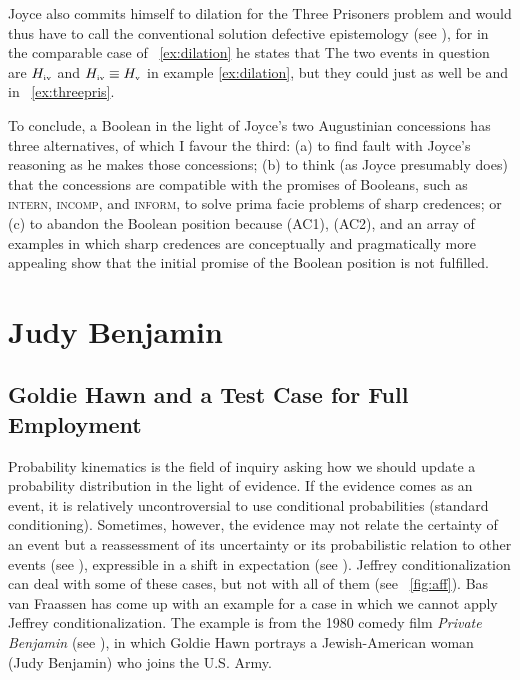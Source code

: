 \documentclass[phd,12pt,oneside]{ubcthesis}
\begin{document}
Joyce also commits himself to dilation for the Three Prisoners problem
and would thus have to call the conventional solution defective
epistemology (see ), for in the comparable case
of {\xample}~\ref{ex:dilation} he states that   The two events
in question are $H_{\mbox{\tiny{iv}}}$ and
$H_{\mbox{\tiny{iv}}}\equiv{}H_{\mbox{\tiny{v}}}$ in example
\ref{ex:dilation}, but they could just as well be  and  in
{\xample}~\ref{ex:threepris}.

To conclude, a Boolean in the light of Joyce's two Augustinian
concessions has three alternatives, of which I favour the third: (a)
to find fault with Joyce's reasoning as he makes those concessions;
(b) to think (as Joyce presumably does) that the concessions are
compatible with the promises of Booleans, such as \textsc{intern},
\textsc{incomp}, and \textsc{inform}, to solve prima facie problems of
sharp credences; or (c) to abandon the Boolean position because (AC1),
(AC2), and an array of examples in which sharp credences are
conceptually and pragmatically more appealing show that the initial
promise of the Boolean position is not fulfilled.

\chapter{Judy Benjamin}
\label{chp:eeyijeen}

\section{Goldie Hawn and a Test Case for Full Employment}
\label{sec:shutepae}

Probability kinematics is the field of inquiry asking how we should
update a probability distribution in the light of evidence. If the
evidence comes as an event, it is relatively uncontroversial to use
conditional probabilities (standard conditioning). Sometimes, however,
the evidence may not relate the certainty of an event but a
reassessment of its uncertainty or its probabilistic relation to other
events (see ), expressible in a shift in
expectation (see ). Jeffrey conditionalization
can deal with some of these cases, but not with all of them (see
{\igure}~\ref{fig:aff}). Bas van Fraassen has come up with an example
for a case in which we cannot apply Jeffrey conditionalization. The
example is from the 1980 comedy film \emph{Private Benjamin} (see
), in which Goldie Hawn portrays a
Jewish-American woman (Judy Benjamin) who joins the U.S. Army.
\end{document}
